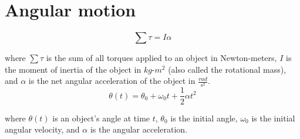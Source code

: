 \section{Angular motion}
\begin{equation*}
  \sum \tau = I\alpha
\end{equation*}

where $\sum \tau$ is the sum of all torques applied to an object in
Newton-meters, $I$ is the moment of inertia of the object in $kg\mbox{-}m^2$
(also called the rotational mass), and $\alpha$ is the net angular acceleration
of the object in $\frac{rad}{s^2}$.
\begin{equation*}
  \theta(t) = \theta_0 + \omega_0 t + \frac{1}{2}\alpha t^2
\end{equation*}

where $\theta(t)$ is an object's angle at time $t$, $\theta_0$ is the initial
angle, $\omega_0$ is the initial angular velocity, and $\alpha$ is the angular
acceleration.
